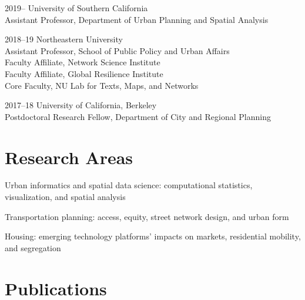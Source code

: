 \documentclass[12pt,letterpaper]{report}
\newcommand{\listitemspace}{0.15em}
\renewenvironment{itemize}
{\begin{list}{}{\setlength{\leftmargin}{0em}
            \setlength{\parskip}{0em}
            \setlength{\itemsep}{\listitemspace}
            \setlength{\parsep}{\listitemspace}}}
    {\end{list}}
\begin{document}
    \begin{tablist}

        \item[2019--]   \tab University of Southern California \\
                             Assistant Professor, Department of Urban Planning and Spatial Analysis

        \item[2018--19] \tab Northeastern University \\
                             Assistant Professor, School of Public Policy and Urban Affairs \\
                             Faculty Affiliate, Network Science Institute \\
                             Faculty Affiliate, Global Resilience Institute \\
                             Core Faculty, NU Lab for Texts, Maps, and Networks

        \item[2017--18] \tab University of California, Berkeley \\
                             Postdoctoral Research Fellow, Department of City and Regional Planning

    \end{tablist}



    \section*{Research Areas}

    \begin{itemize}

        \item Urban informatics and spatial data science: computational statistics, visualization, and spatial analysis

        \item Transportation planning: access, equity, street network design, and urban form

        \item Housing: emerging technology platforms' impacts on markets, residential mobility, and segregation

    \end{itemize}



    \section*{Publications}
\end{document}
